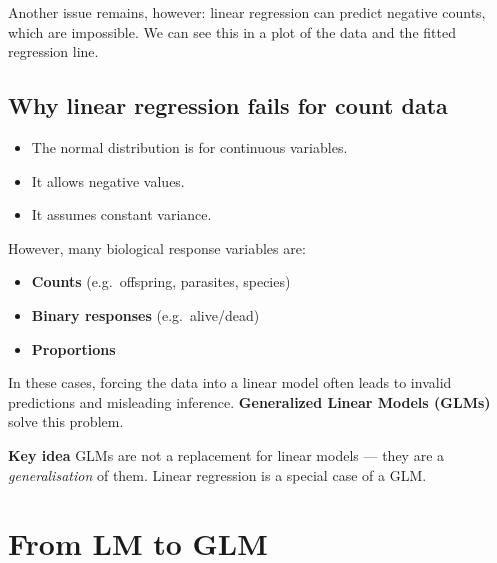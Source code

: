 \documentclass[
  letterpaper,
  8pt,
  a4paper]{book}
\providecommand{\tightlist}{%
  \setlength{\itemsep}{0pt}\setlength{\parskip}{0pt}}
\begin{document}
Another issue remains, however: linear regression can predict negative
counts, which are impossible. We can see this in a plot of the data and
the fitted regression line.

\subsection*{Why linear regression fails for count
data}\label{why-linear-regression-fails-for-count-data}

\begin{itemize}
\tightlist
\item
  The normal distribution is for continuous variables.
\item
  It allows negative values.
\item
  It assumes constant variance.
\end{itemize}

However, many biological response variables are:

\begin{itemize}
\tightlist
\item
  \textbf{Counts} (e.g.~offspring, parasites, species)
\item
  \textbf{Binary responses} (e.g.~alive/dead)
\item
  \textbf{Proportions}
\end{itemize}

In these cases, forcing the data into a linear model often leads to
invalid predictions and misleading inference. \textbf{Generalized Linear
Models (GLMs)} solve this problem.

\begin{tcolorbox}[enhanced jigsaw, arc=.35mm, bottomrule=.15mm, bottomtitle=1mm, breakable, colback=white, colbacktitle=quarto-callout-important-color!10!white, colframe=quarto-callout-important-color-frame, coltitle=black, left=2mm, leftrule=.75mm, opacityback=0, opacitybacktitle=0.6, rightrule=.15mm, title=\textcolor{quarto-callout-important-color}{\faExclamation}\hspace{0.5em}{Important}, titlerule=0mm, toprule=.15mm, toptitle=1mm]

\textbf{Key idea} GLMs are not a replacement for linear models --- they
are a \emph{generalisation} of them. Linear regression is a special case
of a GLM.

\end{tcolorbox}

\section*{From LM to GLM}\label{from-lm-to-glm}
\end{document}
